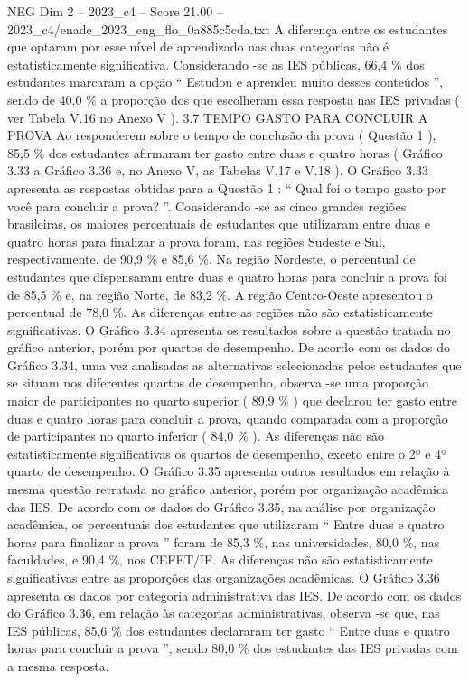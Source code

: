 \begin{textsample}{NEG Dim 2 – 2023\_c4 – Score 21.00 – 2023\_c4/enade\_2023\_eng\_flo\_0a885c5cda.txt}
A diferença entre os estudantes que optaram por esse nível de aprendizado nas duas categorias não é estatisticamente significativa.
Considerando -se as IES públicas, 66,4 \% dos estudantes marcaram a opção “ Estudou e aprendeu muito desses conteúdos ”, sendo de 40,0 \% a proporção dos que escolheram essa resposta nas IES privadas ( ver Tabela V.16 no Anexo V ). 3.7 TEMPO GASTO PARA CONCLUIR A PROVA Ao responderem sobre o tempo de conclusão da prova ( Questão 1 ), 85,5 \% dos estudantes afirmaram ter gasto entre duas e quatro horas ( Gráfico 3.33 a Gráfico 3.36 e, no Anexo V, as Tabelas V.17 e V.18 ).
O Gráfico 3.33 apresenta as respostas obtidas para a Questão 1 : “ Qual foi o tempo gasto por você para concluir a prova? ”.
Considerando -se as cinco grandes regiões brasileiras, os maiores percentuais de estudantes que utilizaram entre duas e quatro horas para finalizar a prova foram, nas regiões Sudeste e Sul, respectivamente, de 90,9 \% e 85,6 \%.
Na região Nordeste, o percentual de estudantes que dispensaram entre duas e quatro horas para concluir a prova foi de 85,5 \% e, na região Norte, de 83,2 \%.
A região Centro-Oeste apresentou o percentual de 78,0 \%.
As diferenças entre as regiões não são estatisticamente significativas.
O Gráfico 3.34 apresenta os resultados sobre a questão tratada no gráfico anterior, porém por quartos de desempenho.
De acordo com os dados do Gráfico 3.34, uma vez analisadas as alternativas selecionadas pelos estudantes que se situam nos diferentes quartos de desempenho, observa -se uma proporção maior de participantes no quarto superior ( 89,9 \% ) que declarou ter gasto entre duas e quatro horas para concluir a prova, quando comparada com a proporção de participantes no quarto inferior ( 84,0 \% ).
As diferenças não são estatisticamente significativas os quartos de desempenho, exceto entre o 2º e 4º quarto de desempenho.
O Gráfico 3.35 apresenta outros resultados em relação à mesma questão retratada no gráfico anterior, porém por organização acadêmica das IES.
De acordo com os dados do Gráfico 3.35, na análise por organização acadêmica, os percentuais dos estudantes que utilizaram “ Entre duas e quatro horas para finalizar a prova ” foram de 85,3 \%, nas universidades, 80,0 \%, nas faculdades, e 90,4 \%, nos CEFET/IF.
As diferenças não são estatisticamente significativas entre as proporções das organizações acadêmicas.
O Gráfico 3.36 apresenta os dados por categoria administrativa das IES.
De acordo com os dados do Gráfico 3.36, em relação às categorias administrativas, observa -se que, nas IES públicas, 85,6 \% dos estudantes declararam ter gasto “ Entre duas e quatro horas para concluir a prova ”, sendo 80,0 \% dos estudantes das IES privadas com a mesma resposta.

\end{textsample}
